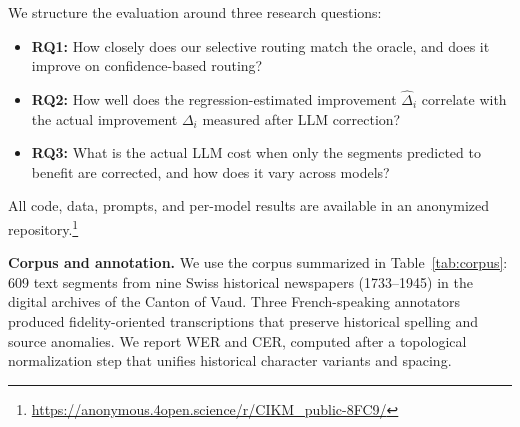 \documentclass[sigconf]{acmart}
\begin{document}
We structure the evaluation around three research questions:
\begin{itemize}
    \item \textbf{RQ1:} How closely does our selective routing match the oracle,
    and does it improve on confidence-based routing?
    \item \textbf{RQ2:} How well does the regression-estimated improvement
    $\hat{\Delta}_i$ correlate with the actual improvement $\Delta_i$ measured
    after LLM correction?
    \item \textbf{RQ3:} What is the actual LLM cost when only the segments
    predicted to benefit are corrected, and how does it vary across models?
\end{itemize}
All code, data, prompts, and per-model results are available in an anonymized
repository.\footnote{\url{https://anonymous.4open.science/r/CIKM_public-8FC9/}}


\medskip\noindent\textbf{Corpus and annotation.}
We use the corpus summarized in Table~\ref{tab:corpus}: 609 text segments from nine Swiss historical newspapers (1733--1945) in the digital archives of the Canton of Vaud. Three French-speaking annotators produced fidelity-oriented
transcriptions that preserve historical spelling and source anomalies. We report
WER and CER, computed after a topological normalization step that unifies
historical character variants and spacing.



\begin{table}[h]
\centering
\caption{Corpus composition by newspaper publication.}
\vspace{-\baselineskip}
\label{tab:corpus}
\end{table}
\end{document}
